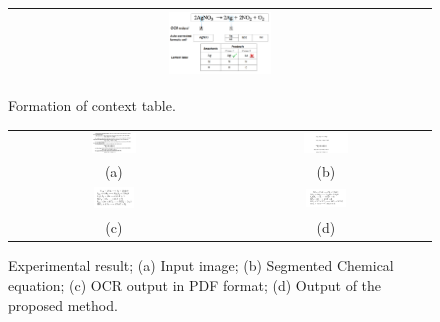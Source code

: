 \begin{figure}[h]
\center\ 
\begin{tabular}{|c|} 
\hline
\includegraphics[width=0.25\textwidth]{equationContext.png}\\
\hline
\end{tabular} 
\caption{Formation of context table. }
\label{context} 
\end{figure}
\begin{figure}[]
\center\footnotesize
\begin{tabular}{ |c|c|}
\hline
 \includegraphics[width=0.22\textwidth]{sampleDocument.png} &
 \includegraphics[width=0.22\textwidth]{DCE.png} \\
(a)  & (b) \\ 
\hline
 \includegraphics[width=0.2\textwidth]{directOCR.jpg} &
\includegraphics[width=0.2\textwidth]{correctedFinalEq.jpg}\\
 
 (c)  & (d)  \\
 \hline
\end{tabular}
\caption{Experimental result; (a) Input image; (b) Segmented Chemical equation;
(c) OCR output in PDF format; (d) Output of the proposed method.}
\label{eg} 
\end{figure}
